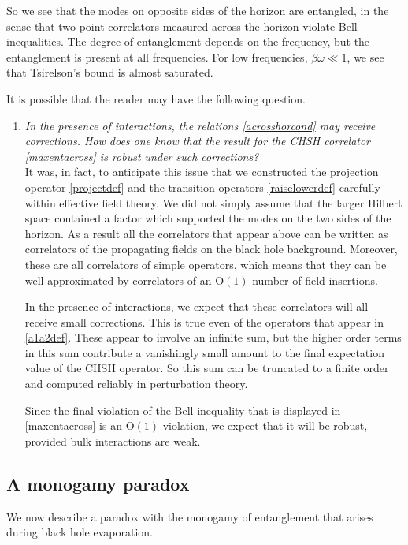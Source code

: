 \documentclass[12pt]{article}
\def\Or[#1]{{\text{O}}\left({#1}\right)}
\begin{document}
So we see that the modes on opposite sides of the horizon are entangled, in the sense that two point correlators measured across the horizon violate Bell inequalities. The degree of entanglement depends on the frequency, but the entanglement is present at all frequencies. For low frequencies, $\beta \omega \ll 1$, we see that Tsirelson's bound is almost saturated.

It is possible that the reader may have the following question.
\begin{enumerate}[qseries]
\item
{\em In the presence of interactions, the relations \eqref{acrosshorcond} may receive corrections. How does one know that the result for the CHSH correlator \eqref{maxentacross} is robust under such corrections?}\\
It was, in fact, to anticipate this issue that we constructed the projection operator \eqref{projectdef} and the transition operators \eqref{raiselowerdef} carefully within effective field theory. We did not simply assume that the larger Hilbert space contained a factor which supported the modes on the two sides of the horizon. As a result all the correlators that appear above can be written as correlators of the propagating fields on the black hole background. Moreover, these are all correlators of simple operators, which means that they can be well-approximated by correlators of an $\Or[1]$ number of field insertions.

In the presence of interactions, we expect that these correlators will all receive small corrections. This is true
even of the operators that appear in \eqref{a1a2def}. These appear to involve an infinite sum, but the higher order terms in this sum contribute a vanishingly small amount to the final expectation value of the CHSH operator. So this sum can be truncated to a finite order and computed reliably in perturbation theory.

Since the final violation of the Bell inequality that is displayed in \eqref{maxentacross} is an $\Or[1]$ violation, we expect that it will be robust, provided bulk interactions are weak.
\end{enumerate}

\subsection{A monogamy paradox \label{secmonogamy}}

We now describe a paradox with the monogamy of entanglement that arises during black hole evaporation.
\end{document}
